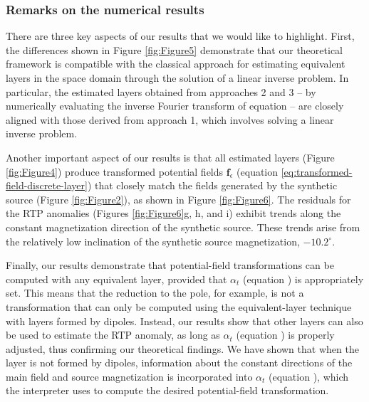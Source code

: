 \subsubsection{Remarks on the numerical results}

There are three key aspects of our results that we would like to highlight.
First, the differences shown in Figure \ref{fig:Figure5} demonstrate that our theoretical 
framework is compatible with the classical approach for estimating equivalent layers in the space 
domain through the solution of a linear inverse problem.
In particular, the estimated layers obtained from approaches 2 and 3  -- 
by numerically evaluating the inverse Fourier transform of equation  --
are closely aligned with those derived from approach 1, which involves solving a linear inverse problem.

Another important aspect of our results is that all estimated layers (Figure \ref{fig:Figure4}) 
produce transformed potential fields $\mathbf{f}_{\epsilon}$ (equation \ref{eq:transformed-field-discrete-layer})  
that closely match the fields generated by the synthetic source (Figure \ref{fig:Figure2}), 
as shown in Figure \ref{fig:Figure6}. The residuals for the RTP anomalies 
(Figures \ref{fig:Figure6}g, h, and i) exhibit trends along the constant magnetization direction of 
the synthetic source. These trends arise from the relatively low inclination of the synthetic source 
magnetization, $-10.2^{\circ}$.

Finally, our results demonstrate that potential-field transformations can be computed with any 
equivalent layer, provided that $\alpha_{t}$ (equation ) is appropriately 
set. This means that the reduction to the pole, for example, is not a transformation that can only 
be computed using the equivalent-layer technique with layers formed by dipoles. Instead, our 
results show that other layers can also be used to estimate the RTP anomaly, as long as $\alpha_{t}$ 
(equation ) is properly adjusted, thus confirming our theoretical findings. 
We have shown that when the layer is not formed by dipoles, information about the constant directions 
of the main field and source magnetization is incorporated into $\alpha_{t}$ 
(equation ), which the interpreter uses to compute the desired 
potential-field transformation.



